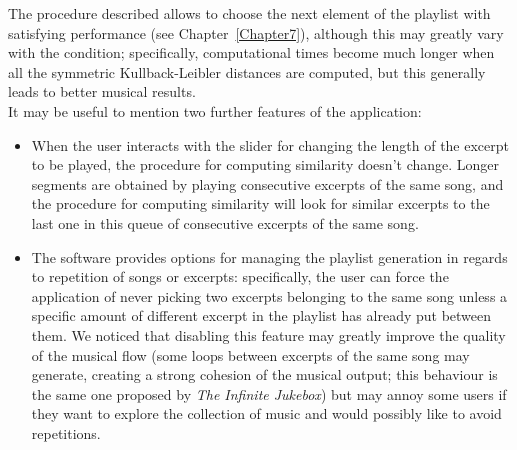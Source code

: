 The procedure described allows to choose the next element of the playlist with satisfying performance (see Chapter~\ref{Chapter7}), although this may greatly vary with the condition; specifically, computational times become much longer when all the symmetric Kullback-Leibler distances are computed, but this generally leads to better musical results. \\
It may be useful to mention two further features of the application:
\begin{itemize}
\item When the user interacts with the slider for changing the length of the excerpt to be played, the procedure for computing similarity doesn't change. Longer segments are obtained by playing consecutive excerpts of the same song, and the procedure for computing similarity will look for similar excerpts to the last one in this queue of consecutive excerpts of the same song.
\item The software provides options for managing the playlist generation in regards to repetition of songs or excerpts: specifically, the user can force the application of never picking two excerpts belonging to the same song unless a specific amount of different excerpt in the playlist has already put between them. We noticed that disabling this feature may greatly improve the quality of the musical flow (some loops between excerpts of the same song may generate, creating a strong cohesion of the musical output; this behaviour is the same one proposed by \textit{The Infinite Jukebox}) but may annoy some users if they want to explore the collection of music and would possibly like to avoid repetitions.
\end{itemize}



